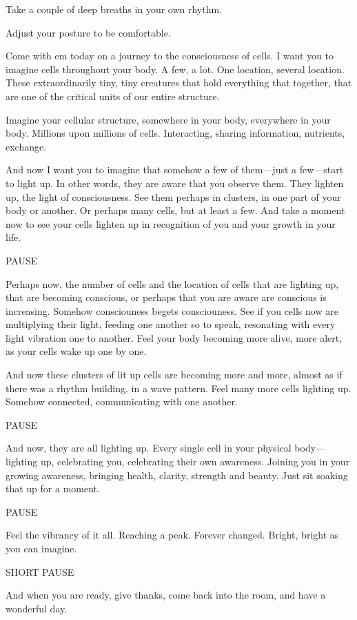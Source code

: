 \documentclass[12pt]{book}
\begin{document}
{\em


Take a couple of deep breaths in your own rhythm.

Adjust your posture to be comfortable.

Come with em today on a journey to the consciousness of cells.
I want you to imagine
cells throughout your body. A few, a lot. One location, several location.
These extraordinarily tiny, tiny creatures that hold everything that together, that
are one of the critical units of our entire structure.

Imagine your cellular structure, somewhere in your body, everywhere in your body.
Millions upon millions of cells. Interacting, sharing information, nutrients,
exchange.

And now I want you to imagine that somehow a few of them---just a few---start to light up.
In other words, they are aware that you observe them.
They lighten up, the light of consciousness.
See them perhaps in clusters, in one part of your body or another.
Or perhaps many cells, but at least a few. And take a moment now
to see your cells lighten up in recognition of you and your growth in
your life.

PAUSE

Perhaps now, the number of cells and the location of cells that are lighting
up, that are becoming conscious, or perhaps that you are aware are conscious
is increasing. Somehow consciouness begets consciouness. See if you cells
now are multiplying their light, feeding one another so to speak, resonating
with every light vibration one to another. Feel your body becoming more
alive, more alert, as your cells wake up one by one.

And now these clusters of lit up cells are becoming more and more, almost
as if there was a rhythm building.
in a wave pattern. Feel many more cells lighting up. Somehow connected,
communicating with one another.

PAUSE

And now, they are all lighting up. Every single cell in your physical
body---lighting up, celebrating you, celebrating their own awareness.
Joining you in your growing awareness, bringing health, clarity,
strength and beauty. Just sit soaking that up for a moment.

PAUSE

Feel the vibrancy of it all. Reaching a peak. Forever changed.
Bright, bright as you can imagine.

SHORT PAUSE

And when you are ready, give thanks, come back into the room,
and have a wonderful day.

}
\end{document}
